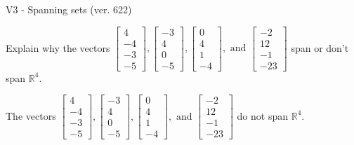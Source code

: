 \begin{exercise}
  \begin{exerciseTitle}V3 - Spanning sets (ver. 622)\end{exerciseTitle}
  \begin{exerciseStatement}
    Explain why the vectors \(\left[\begin{array}{r}
4 \\
-4 \\
-3 \\
-5
\end{array}\right] , \left[\begin{array}{r}
-3 \\
4 \\
0 \\
-5
\end{array}\right] , \left[\begin{array}{r}
0 \\
4 \\
1 \\
-4
\end{array}\right] , \text{ and } \left[\begin{array}{r}
-2 \\
12 \\
-1 \\
-23
\end{array}\right]\) span or don't span \(\mathbb{R}^4\). 
	


  \end{exerciseStatement}
  \begin{exerciseAnswer}
   The vectors \(\left[\begin{array}{r}
4 \\
-4 \\
-3 \\
-5
\end{array}\right] , \left[\begin{array}{r}
-3 \\
4 \\
0 \\
-5
\end{array}\right] , \left[\begin{array}{r}
0 \\
4 \\
1 \\
-4
\end{array}\right] , \text{ and } \left[\begin{array}{r}
-2 \\
12 \\
-1 \\
-23
\end{array}\right]\) 
  	 do not  
	span \(\mathbb{R}^4\).
  


  \end{exerciseAnswer}
\end{exercise}